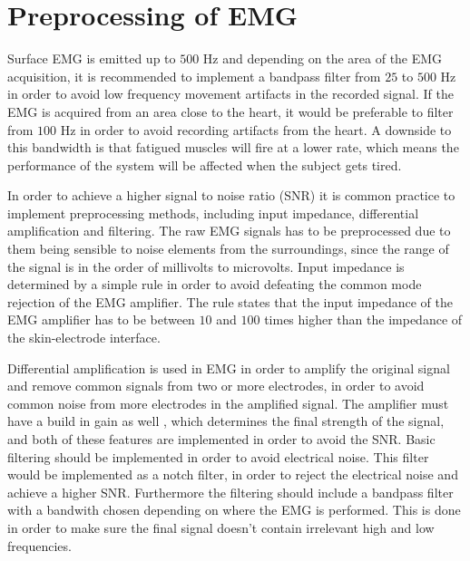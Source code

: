 \section{Preprocessing of EMG}

Surface EMG is emitted up to $500$ Hz and depending on the area of the EMG acquisition, it is recommended to implement a bandpass filter from $25$ to $500$ Hz in order to avoid low frequency movement artifacts in the recorded signal. If the EMG is acquired from an area close to the heart, it would be preferable to filter from $100$ Hz in order to avoid recording artifacts from the heart. A downside to this bandwidth is that fatigued muscles will fire at a lower rate, which means the performance of the system will be affected when the subject gets tired. \cite{cram2012} %

In order to achieve a higher signal to noise ratio (SNR) it is common practice to implement preprocessing methods, including input impedance, differential amplification and filtering. The raw EMG signals has to be preprocessed due to them being sensible to noise elements from the surroundings, since the range of the signal is in the order of millivolts to microvolts. Input impedance is determined by a simple rule in order to avoid defeating the common mode rejection of the EMG amplifier. The rule states that the input impedance of the EMG amplifier has to be between $10$ and $100$ times higher than the impedance of the skin-electrode interface. \cite{cram2012}

Differential amplification is used in EMG in order to amplify the original signal and remove common signals from two or more electrodes, in order to avoid common noise from more electrodes in the amplified signal. The amplifier must have a build in gain as well , which determines the final strength of the signal, and both of these features are implemented in order to avoid the SNR. Basic filtering should be implemented in order to avoid electrical noise. This filter would be implemented as a notch filter, in order to reject the electrical noise and achieve a higher SNR. Furthermore the filtering should include a bandpass filter with a bandwith chosen depending on where the EMG is performed. This is done in order to make sure the final signal doesn't contain irrelevant high and low frequencies.\cite{cram2012}